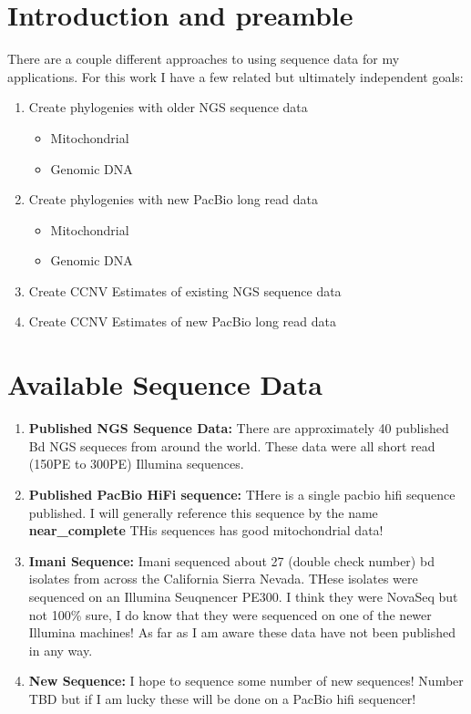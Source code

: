 \documentclass{article}
\begin{document}
    \section{Introduction and preamble}
    There are a couple different approaches to using sequence data for my applications.  For this work I have a few related but ultimately independent goals:
    \begin{enumerate}
        \item Create phylogenies with older NGS sequence data
           \begin{itemize}
            \item Mitochondrial
            \item Genomic DNA
           \end{itemize}
        \item Create phylogenies with new PacBio long read data
           \begin{itemize}
            \item Mitochondrial
            \item Genomic DNA
           \end{itemize}
        \item Create CCNV Estimates of existing NGS sequence data
        \item Create CCNV Estimates of new PacBio long read data
    \end{enumerate}

    \section{Available Sequence Data}
    \begin{enumerate}
        \item \textbf{Published NGS Sequence Data:}  There are approximately 40 published Bd NGS sequeces from around the world.   These data were all short read (150PE to 300PE) Illumina sequences.
        
        \item \textbf{Published PacBio HiFi sequence:} THere is a single pacbio hifi sequence published. I will generally reference this sequence by the name \textbf{near\_complete} THis sequences has good mitochondrial data!

        \item \textbf{Imani Sequence:} Imani sequenced about 27 (double check number) bd isolates from across the California Sierra Nevada.  THese isolates were sequenced on an Illumina Seuqnencer PE300.  I think they were NovaSeq but not 100\% sure, I do know that they were sequenced on one of the newer Illumina machines!   As far as I am aware these data have not been published in any way.
    
        \item \textbf{New Sequence:}  I hope to sequence some number of new sequences!   Number TBD but if I am lucky these will be done on a PacBio hifi sequencer! 
    \end{enumerate}
\end{document}
